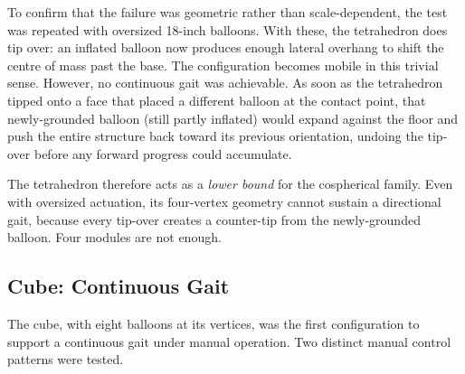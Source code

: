 To confirm that the failure was geometric rather than scale-dependent, the test was repeated with oversized 18-inch balloons. With these, the tetrahedron does tip over: an inflated balloon now produces enough lateral overhang to shift the centre of mass past the base. The configuration becomes mobile in this trivial sense. However, no continuous gait was achievable. As soon as the tetrahedron tipped onto a face that placed a different balloon at the contact point, that newly-grounded balloon (still partly inflated) would expand against the floor and push the entire structure back toward its previous orientation, undoing the tip-over before any forward progress could accumulate.

The tetrahedron therefore acts as a \textit{lower bound} for the cospherical family. Even with oversized actuation, its four-vertex geometry cannot sustain a directional gait, because every tip-over creates a counter-tip from the newly-grounded balloon. Four modules are not enough.



\subsection{Cube: Continuous Gait}
\label{subsec:cube-test}

The cube, with eight balloons at its vertices, was the first configuration to support a continuous gait under manual operation. Two distinct manual control patterns were tested.

